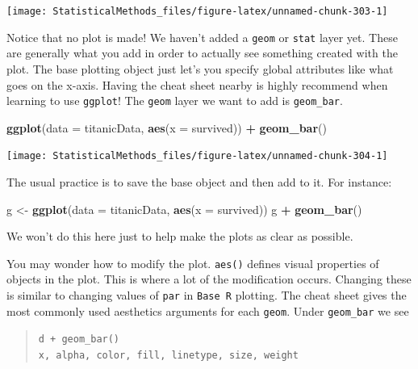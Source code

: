 \documentclass[
]{book}
\newenvironment{Shaded}{\begin{snugshade}}{\end{snugshade}}
\newcommand{\DataTypeTok}[1]{\textcolor[rgb]{0.13,0.29,0.53}{#1}}
\newcommand{\KeywordTok}[1]{\textcolor[rgb]{0.13,0.29,0.53}{\textbf{#1}}}
\newcommand{\NormalTok}[1]{#1}
\newcommand{\OperatorTok}[1]{\textcolor[rgb]{0.81,0.36,0.00}{\textbf{#1}}}
\newcommand{\StringTok}[1]{\textcolor[rgb]{0.31,0.60,0.02}{#1}}
\theoremstyle{definition}
\theoremstyle{definition}
\theoremstyle{definition}
\theoremstyle{remark}
\begin{document}
\begin{center}\texttt{[image: StatisticalMethods\_files/figure-latex/unnamed-chunk-303-1]} \end{center}

Notice that no plot is made! We haven't added a \texttt{geom} or \texttt{stat} layer yet. These are generally what you add in order to actually see something created with the plot. The base plotting object just let's you specify global attributes like what goes on the x-axis. Having the cheat sheet nearby is highly recommend when learning to use \texttt{ggplot}! The \texttt{geom} layer we want to add is \texttt{geom\_bar}.

\begin{Shaded}
\begin{Highlighting}[]
\KeywordTok{ggplot}\NormalTok{(}\DataTypeTok{data =}\NormalTok{ titanicData, }\KeywordTok{aes}\NormalTok{(}\DataTypeTok{x =}\NormalTok{ survived)) }\OperatorTok{+}\StringTok{ }\KeywordTok{geom_bar}\NormalTok{()}
\end{Highlighting}
\end{Shaded}

\begin{center}\texttt{[image: StatisticalMethods\_files/figure-latex/unnamed-chunk-304-1]} \end{center}

The usual practice is to save the base object and then add to it. For instance:

\begin{Shaded}
\begin{Highlighting}[]
\NormalTok{g <-}\StringTok{ }\KeywordTok{ggplot}\NormalTok{(}\DataTypeTok{data =}\NormalTok{ titanicData, }\KeywordTok{aes}\NormalTok{(}\DataTypeTok{x =}\NormalTok{ survived))}
\NormalTok{g }\OperatorTok{+}\StringTok{ }\KeywordTok{geom_bar}\NormalTok{()}
\end{Highlighting}
\end{Shaded}

We won't do this here just to help make the plots as clear as possible.

You may wonder how to modify the plot. \texttt{aes()} defines visual properties of objects in the plot. This is where a lot of the modification occurs. Changing these is similar to changing values of \texttt{par} in \texttt{Base\ R} plotting. The cheat sheet gives the most commonly used aesthetics arguments for each \texttt{geom}. Under \texttt{geom\_bar} we see

\begin{quote}
\texttt{d\ +\ geom\_bar()}~\\
\texttt{x,\ alpha,\ color,\ fill,\ linetype,\ size,\ weight}
\end{quote}
\end{document}
